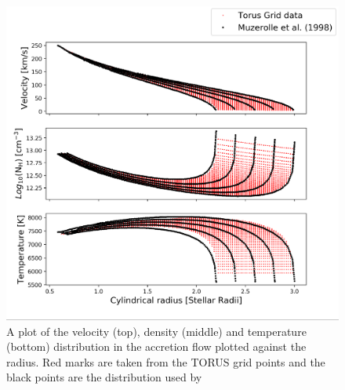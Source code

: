 \documentclass[fleqn,usenatbib]{mnras}
\begin{document}
\begin{figure}
    \centering
    \includegraphics[width=\linewidth,trim={0 1cm 0 0},clip]{figures/density}
    \caption{A plot of the velocity (top), density (middle) and temperature (bottom) distribution in the accretion flow plotted against the radius. Red marks are taken from the TORUS grid points and the black points are the distribution used by~\citet{1998ApJ...492..743M}}
    \label{fig:density}
\end{figure}
\end{document}
